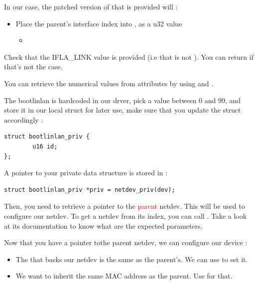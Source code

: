  In our case, the patched version of  that is provided will :
 \begin{itemize}
	 \item Place the parent's interface index into , as a u32 value
		 \begin{itemize}
			\item {}\textcolor{red}{}
		 \end{itemize}
 \end{itemize}

 Check that the IFLA\_LINK value is provided (i.e that  is not ). You can return  if that's not the case.

You can retrieve the numerical values from attributes by using and .

The bootlinlan  is hardcoded in our drver, pick a value between 0 and 99, and store it in our local  struct for later use, make sure that you update the struct accordingly :

\begin{verbatim}
struct bootlinlan_priv {
        u16 id;
};
\end{verbatim}

A pointer to your private data structure is stored in  :

\begin{verbatim}
struct bootlinlan_priv *priv = netdev_priv(dev);
\end{verbatim}

Then, you need to retrieve a pointer to the \textcolor{red}{parent} netdev. This will be used to configure our netdev.
To get a netdev from its index, you can call . Take a look at its documentation to know what are the expected parameters.

Now that you have a pointer tothe parent netdev, we can configure our device :

\begin{itemize}
	\item The  that backs our netdev is the same as the parent's. We can use  to set it.
	\item We want to inherit the same MAC address as the parent. Use  for that.
\end{itemize}


